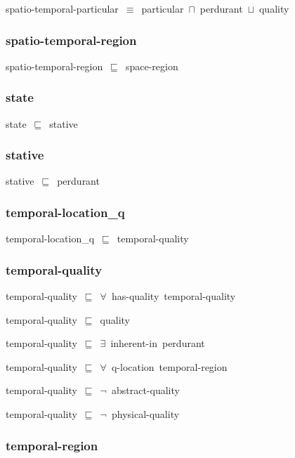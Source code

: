 \documentclass{article}
\begin{document}
spatio-temporal-particular~\ensuremath{\equiv}~particular~\ensuremath{\sqcap}~perdurant~\ensuremath{\sqcup}~quality

\subsubsection*{spatio-temporal-region}

spatio-temporal-region~\ensuremath{\sqsubseteq}~space-region~

\subsubsection*{state}

state~\ensuremath{\sqsubseteq}~stative~

\subsubsection*{stative}

stative~\ensuremath{\sqsubseteq}~perdurant~

\subsubsection*{temporal-location_q}

temporal-location\_q~\ensuremath{\sqsubseteq}~temporal-quality~

\subsubsection*{temporal-quality}

temporal-quality~\ensuremath{\sqsubseteq}~\ensuremath{\forall}~has-quality~temporal-quality~

temporal-quality~\ensuremath{\sqsubseteq}~quality~

temporal-quality~\ensuremath{\sqsubseteq}~\ensuremath{\exists}~inherent-in~perdurant~

temporal-quality~\ensuremath{\sqsubseteq}~\ensuremath{\forall}~q-location~temporal-region~

temporal-quality~\ensuremath{\sqsubseteq}~\ensuremath{\lnot}~abstract-quality

temporal-quality~\ensuremath{\sqsubseteq}~\ensuremath{\lnot}~physical-quality

\subsubsection*{temporal-region}
\end{document}
